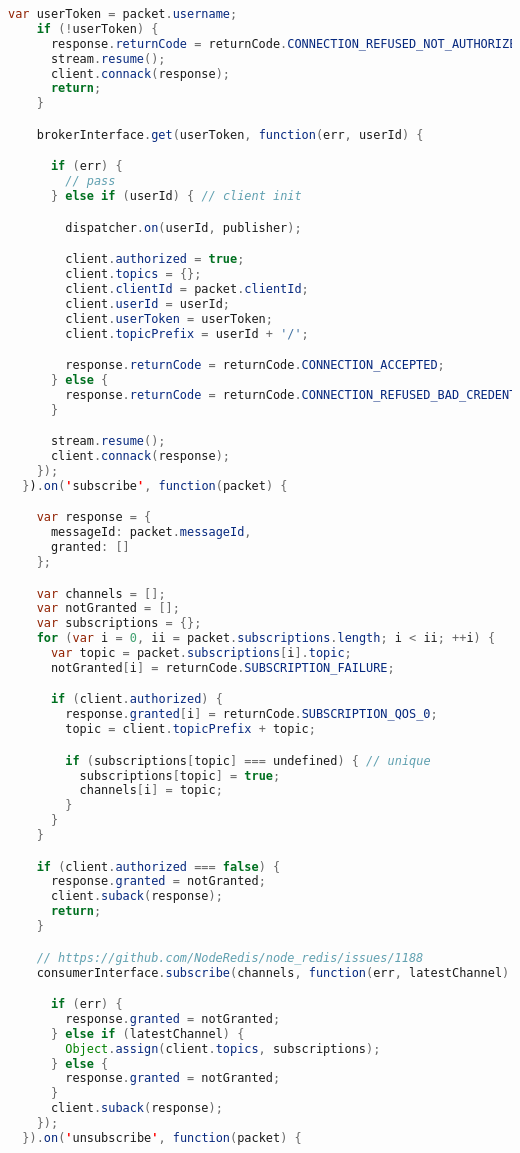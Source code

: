 \begin{lstlisting}[language=java, captionpos=b, caption={Dispatcher broker MQTT}, basicstyle=\scriptsize\ttfamily]
    var userToken = packet.username;
    if (!userToken) {
      response.returnCode = returnCode.CONNECTION_REFUSED_NOT_AUTHORIZED;
      stream.resume();
      client.connack(response);
      return;
    }

    brokerInterface.get(userToken, function(err, userId) {

      if (err) {
        // pass
      } else if (userId) { // client init

        dispatcher.on(userId, publisher);

        client.authorized = true;
        client.topics = {};
        client.clientId = packet.clientId;
        client.userId = userId;
        client.userToken = userToken;
        client.topicPrefix = userId + '/';

        response.returnCode = returnCode.CONNECTION_ACCEPTED;
      } else {
        response.returnCode = returnCode.CONNECTION_REFUSED_BAD_CREDENTIALS;
      }

      stream.resume();
      client.connack(response);
    });
  }).on('subscribe', function(packet) {

    var response = {
      messageId: packet.messageId,
      granted: []
    };

    var channels = [];
    var notGranted = [];
    var subscriptions = {};
    for (var i = 0, ii = packet.subscriptions.length; i < ii; ++i) {
      var topic = packet.subscriptions[i].topic;
      notGranted[i] = returnCode.SUBSCRIPTION_FAILURE;

      if (client.authorized) {
        response.granted[i] = returnCode.SUBSCRIPTION_QOS_0;
        topic = client.topicPrefix + topic;

        if (subscriptions[topic] === undefined) { // unique
          subscriptions[topic] = true;
          channels[i] = topic;
        }
      }
    }

    if (client.authorized === false) {
      response.granted = notGranted;
      client.suback(response);
      return;
    }

    // https://github.com/NodeRedis/node_redis/issues/1188
    consumerInterface.subscribe(channels, function(err, latestChannel) {

      if (err) {
        response.granted = notGranted;
      } else if (latestChannel) {
        Object.assign(client.topics, subscriptions);
      } else {
        response.granted = notGranted;
      }
      client.suback(response);
    });
  }).on('unsubscribe', function(packet) {


\end{lstlisting}
